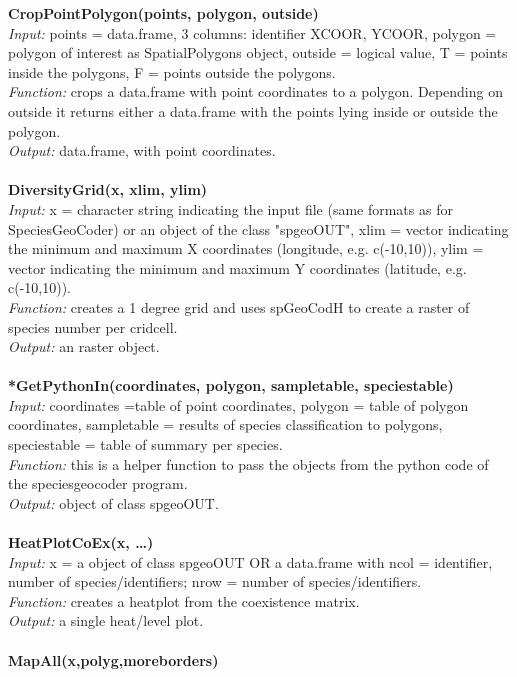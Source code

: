 \documentclass[a4paper,titlepage,11pt]{scrreprt}
\begin{document}
\textbf{CropPointPolygon(points, polygon, outside)}\\
\textit{Input:} points = data.frame, 3 columns: identifier XCOOR, YCOOR, polygon = polygon of interest as SpatialPolygons object, outside = logical value, T = points inside the polygons, F = points outside the polygons.\\
\textit{Function:} crops a data.frame with point coordinates to a polygon. Depending on outside it returns either a data.frame with the points lying inside or outside the polygon.\\
\textit{Output:} data.frame, with point coordinates.\\
\\
\textbf{DiversityGrid(x, xlim, ylim)}\\
\textit{Input:} x = character string indicating the input file (same formats as for SpeciesGeoCoder) or an object of the class "spgeoOUT", xlim = vector indicating the minimum and maximum X coordinates (longitude, e.g. c(-10,10)), ylim = vector indicating the minimum and maximum Y coordinates (latitude, e.g. c(-10,10)).\\
\textit{Function:} creates a 1 degree grid and uses spGeoCodH to create a raster of species number per cridcell.\\
\textit{Output:} an raster object.\\
\\
\textbf{*GetPythonIn(coordinates, polygon, sampletable, speciestable)}\\
\textit{Input:} coordinates =table of point coordinates, polygon = table of polygon coordinates, sampletable = results of species classification to polygons, speciestable = table of summary per species.\\
\textit{Function:} this is a helper function to pass the objects from the python code of the speciesgeocoder program.\\
\textit{Output:} object of class spgeoOUT.\\
\\
\textbf{HeatPlotCoEx(x, \dots)}\\
\textit{Input:} x = a object of class spgeoOUT OR a data.frame with ncol = identifier, number of species/identifiers; nrow = number of species/identifiers.\\
\textit{Function:} creates a heatplot from the coexistence matrix.\\
\textit{Output:} a single heat/level plot.\\
\\
\textbf{MapAll(x,polyg,moreborders)}\\
\end{document}
